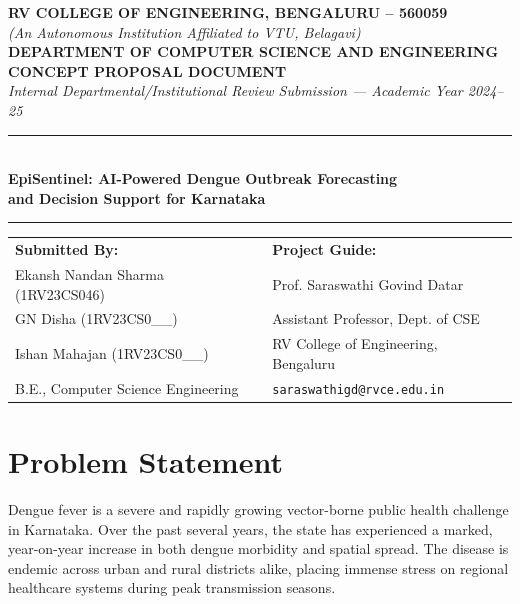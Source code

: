 \documentclass[11pt,a4paper]{article}
\begin{document}
\begin{center}
  {\large\textbf{RV COLLEGE OF ENGINEERING, BENGALURU -- 560059}} \\[1pt]
  {\small\textit{(An Autonomous Institution Affiliated to VTU, Belagavi)}} \\[1pt]
  {\small\textbf{DEPARTMENT OF COMPUTER SCIENCE AND ENGINEERING}} \\[6pt]
  {\large\textbf{CONCEPT PROPOSAL DOCUMENT}} \\[1pt]
  {\small\textit{Internal Departmental/Institutional Review Submission --- Academic Year 2024--25}} \\[8pt]
  \rule{\textwidth}{0.8pt} \\[4pt]
  {\Large\textbf{EpiSentinel: AI-Powered Dengue Outbreak Forecasting\\[2pt] and Decision Support for Karnataka}} \\[4pt]
  \rule{\textwidth}{0.8pt}
\end{center}

\vspace{4pt}

\noindent
\begin{tabular}{@{}ll}
  \textbf{Submitted By:} & \textbf{Project Guide:} \\[2pt]
  Ekansh Nandan Sharma (1RV23CS046) & Prof. Saraswathi Govind Datar \\
  GN Disha (1RV23CS0\_\_) & Assistant Professor, Dept. of CSE \\
  Ishan Mahajan (1RV23CS0\_\_) & RV College of Engineering, Bengaluru \\
  B.E., Computer Science Engineering & \texttt{saraswathigd@rvce.edu.in} \\
\end{tabular}

\vspace{6pt}

\section{Problem Statement}
\label{sec:problem}

Dengue fever is a severe and rapidly growing vector-borne public health challenge in Karnataka. Over the past several years, the state has experienced a marked, year-on-year increase in both dengue morbidity and spatial spread. The disease is endemic across urban and rural districts alike, placing immense stress on regional healthcare systems during peak transmission seasons.
\end{document}
